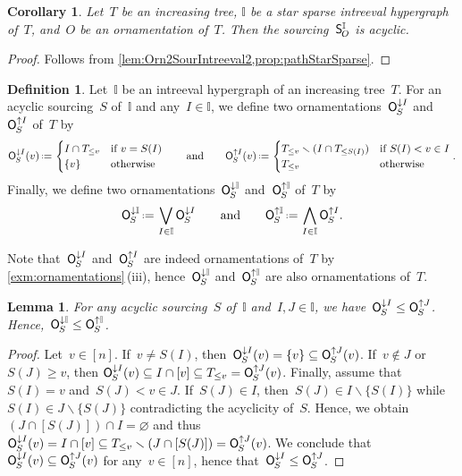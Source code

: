 \documentclass{amsart}
\newtheorem{corollary}[theorem]{Corollary}
\newtheorem{lemma}[theorem]{Lemma}
\theoremstyle{definition}
\newtheorem{definition}[theorem]{Definition}
\newcommand{\ssm}{\smallsetminus} %
\newcommand{\eqdef}{\mbox{\,\raisebox{0.2ex}{\scriptsize\ensuremath{\mathrm:}}\ensuremath{=}\,}} %
\newcommand{\bigMeet}{\bigwedge} %
\newcommand{\bigJoin}{\bigvee} %
\newcommand{\lessin}[2]{#1_{\le#2}} %
\newcommand{\mymap}[2]{\mathsf{#1}_{\hspace{-.7pt}#2}}
\newcommand{\minorn}[2]{\mymap{O}{#1}^{\downarrow#2}}  %
\newcommand{\maxorn}[2]{\mymap{O}{#1}^{\uparrow#2}}  %
\newcommand{\sour}[1]{\mymap{S}{#1}}  %
\newcommand{\II}{\mathbb I} %
\begin{document}
\begin{corollary}
\label{coro:Orn2SourIntreeval3}
Let~$T$ be an increasing tree, $\II$ be a star sparse intreeval hypergraph of~$T$, and~$O$ be an ornamentation of~$T$.
Then the sourcing~$\sour{O}^\II$ is acyclic.
\end{corollary}

\begin{proof}
Follows from \cref{lem:Orn2SourIntreeval2,prop:pathStarSparse}.
\end{proof}

\begin{definition}
Let~$\II$ be an intreeval hypergraph of an increasing tree~$T$.
For an acyclic sourcing~$S$ of~$\II$ and any~$I \in \II$, we define two ornamentations~$\minorn{S}{I}$ and~$\maxorn{S}{I}$ of~$T$ by
\[
\minorn{S}{I}(v) \eqdef \begin{cases} I \cap \lessin{T}{v} & \text{if } v = S(I) \\ \{v\} & \text{otherwise} \end{cases}
\qquad\text{and}\qquad
\maxorn{S}{I}(v) \eqdef  \begin{cases} \lessin{T}{v} \ssm (I \cap \lessin{T}{S(I)}) & \text{if } S(I) < v \in I \\ \lessin{T}{v} & \text{otherwise} \end{cases}
.
\]
Finally, we define two ornamentations~$\minorn{S}{\II}$ and~$\maxorn{S}{\II}$ of~$T$ by
\[
\minorn{S}{\II} \eqdef \bigJoin_{I \in \II} \minorn{S}{I}
\qquad\text{and}\qquad
\maxorn{S}{\II} \eqdef \bigMeet_{I \in \II} \maxorn{S}{I}
.
\]
\end{definition}

Note that~$\minorn{S}{I}$ and~$\maxorn{S}{I}$ are indeed ornamentations of~$T$ by \cref{exm:ornamentations}\,(iii), hence~$\minorn{S}{\II}$ and~$\maxorn{S}{\II}$ are also ornamentations of~$T$.

\begin{lemma}
\label{lem:Sour2OrnIntreeval1}
For any acyclic sourcing~$S$ of~$\II$ and~$I, J \in \II$, we have~$\minorn{S}{I} \le \maxorn{S}{J}$.
Hence,~$\minorn{S}{\II} \le \maxorn{S}{\II}$.
\end{lemma}

\begin{proof}
Let~$v \in [n]$.
If~$v \ne S(I)$, then~$\minorn{S}{I}(v) = \{v\} \subseteq \maxorn{S}{J}(v)$.
If~$v \notin J$ or~$S(J) \ge v$, then ${\minorn{S}{I}(v) \subseteq I \cap [v] \subseteq \lessin{T}{v} = \maxorn{S}{J}(v)}$.
Finally, assume that~$S(I) = v$ and~$S(J) < v \in J$.
If~$S(J) \in I$, then~$S(J) \in I \ssm \{S(I)\}$ while~$S(I) \in J \ssm \{S(J)\}$ contradicting the acyclicity of~$S$.
Hence, we obtain~$(J \cap [S(J)]) \cap I = \varnothing$ and thus~$\minorn{S}{I}(v) = I \cap [v] \subseteq \lessin{T}{v} \ssm (J \cap [S(J)])= \maxorn{S}{J}(v)$.
We conclude that~$\minorn{S}{I}(v) \subseteq \maxorn{S}{J}(v)$ for any~$v \in [n]$, hence that~$\minorn{S}{I} \le \maxorn{S}{J}$.
\end{proof}
\end{document}
